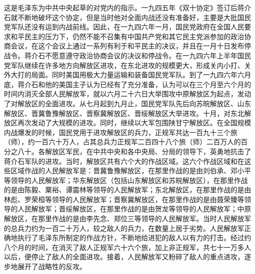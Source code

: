 \documentclass[cn,11pt,chinese]{elegantbook}
\begin{document}
\begin{introduction}\item  这是毛泽东为中共中央起草的对党内的指示。一九四五年《双十协定》签订后蒋介石就不断地破坏这个协定，但是当时他对全面内战还没有准备好，主要是大批国民党军队还没有运到内战前线。因此，在一九四六年一月，国民党政府在全国人民要求和平民主的压力下，仍然不能不召集有中国共产党和其它民主党派参加的政治协商会议，在这个会议上通过一系列有利于和平民主的决议，并且在一月十日发布停战令。蒋介石不愿意遵守政治协商会议的决议和停战令。在一九四六年上半年国民党军队继续在许多地方向解放区进攻，在东北进攻的规模更大，形成关内小打、关外大打的局面。同时美国用极大力量运输和装备国民党军队。到了一九四六年六月底，蒋介石和他的美国主子认为已经有了充分准备，认为可以在三个月至六个月的时间内消灭全部人民解放军，就以六月二十六日大举围攻中原解放区为起点，发动了对解放区的全面进攻。从七月起到九月止，国民党军队先后向苏皖解放区、山东解放区、晋冀鲁豫解放区、晋察冀解放区、晋绥解放区大举进攻。十月，对东北解放区再次发动了大规模的进攻。同时，继续以大军包围陕甘宁解放区。在全国规模内战爆发的时候，国民党用于进攻解放区的兵力，正规军共达一百九十三个旅（师），约一百六十万人，占其总兵力正规军二百四十八个旅（师）二百万人的百分之八十。各解放区军民，在中共中央和各中央局、分局的领导下，英勇地抗击了蒋介石军队的进攻。当时，解放区共有六个大的作战区域。这六个作战区域和在这些区域作战的人民解放军是：晋冀鲁豫解放区，在那里作战的是由刘伯承、邓小平等领导的人民解放军；华东解放区（包括山东解放区和苏皖解放区），在那里作战的是由陈毅、粟裕、谭震林等领导的人民解放军；东北解放区，在那里作战的是由林彪、罗荣桓等领导的人民解放军；晋察冀解放区，在那里作战的是由聂荣臻等领导的人民解放军；晋绥解放区，在那里作战的是由贺龙等领导的人民解放军；中原解放区，在那里作战的是由李先念、郑位三等领导的人民解放军。当时人民解放军的总兵力约为一百二十万人，较之敌人的兵力，在数量上居于劣势。人民解放军正确地执行了毛泽东所制定的作战方针，不断地给进犯的敌人以有力的打击。经过约八个月的时间，在消灭了敌人正规军六十六个旅，加上非正规军，共七十一万多人以后，便停止了敌人的全面进攻。接着，人民解放军又粉碎了敌人的重点进攻，逐步地展开了战略性的反攻。\end{introduction}
\end{document}
